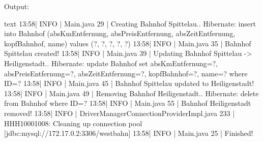 Output:

\begin{code}{text}
13:58| INFO | Main.java 29 | Creating Bahnhof Spittelau..
Hibernate:
    insert
    into
        Bahnhof
        (absKmEntfernung, absPreisEntfernung, absZeitEntfernung, kopfBahnhof, name)
    values
        (?, ?, ?, ?, ?)
13:58| INFO | Main.java 35 | Bahnhof Spittelau created!
13:58| INFO | Main.java 39 | Updating Bahnhof Spittelau -> Heiligenstadt..
Hibernate:
    update
        Bahnhof
    set
        absKmEntfernung=?,
        absPreisEntfernung=?,
        absZeitEntfernung=?,
        kopfBahnhof=?,
        name=?
    where
        ID=?
13:58| INFO | Main.java 45 | Bahnhof Spittelau updated to Heiligenstadt!
13:58| INFO | Main.java 49 | Removing Bahnhof Heiligenstadt..
Hibernate:
    delete
    from
        Bahnhof
    where
        ID=?
13:58| INFO | Main.java 55 | Bahnhof Heiligenstadt removed!
13:58| INFO | DriverManagerConnectionProviderImpl.java 233 | HHH10001008: Cleaning up connection pool [jdbc:mysql://172.17.0.2:3306/westbahn]
13:58| INFO | Main.java 25 | Finished!
\end{code}


